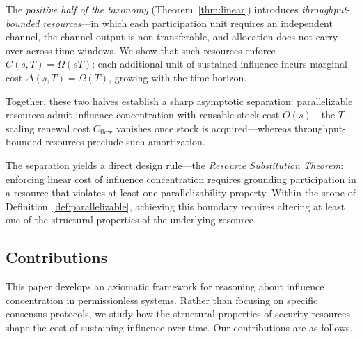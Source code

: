 \documentclass[manuscript,review]{acmart}
\theoremstyle{remark}
\begin{document}
	The \emph{positive half of the taxonomy}
	(Theorem~\ref{thm:linear}) introduces
	\emph{throughput-bounded resources}---in which each
	participation unit requires an independent channel, the
	channel output is non-transferable, and allocation does not
	carry over across time windows. We show that such resources
	enforce $C(s,T)=\Omega(sT)$: each additional unit of
	sustained influence incurs marginal cost
	$\Delta(s,T)=\Omega(T)$, growing with the time horizon.
	
	Together, these two halves establish a sharp asymptotic
	separation: parallelizable resources admit influence
	concentration with reusable stock cost $O(s)$---the
	$T$-scaling renewal cost $C_{\mathrm{flow}}$ vanishes
	once stock is acquired---whereas throughput-bounded
	resources preclude such amortization.
	
	The separation yields a direct design rule---the
	\emph{Resource Substitution Theorem}: enforcing linear
	cost of influence concentration requires grounding
	participation in a resource that violates at least one
	parallelizability property. Within the scope of
	Definition~\ref{def:parallelizable}, achieving this
	boundary requires altering at least one of the structural
	properties of the underlying resource.
	
	
	\subsection{Contributions}
	\label{ssec:contributions}
	
	This paper develops an axiomatic framework for reasoning
	about influence concentration in permissionless systems.
	Rather than focusing on specific consensus protocols, we
	study how the structural properties of security resources
	shape the cost of sustaining influence over time. Our
	contributions are as follows.
	
\end{document}
